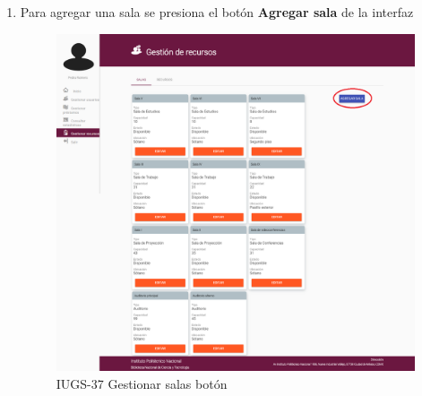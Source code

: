 	\begin{enumerate}
		\item Para agregar una sala se presiona 
			el botón \textbf{Agregar sala} de la interfaz \par
			\begin{figure}[hbtp]	
				\centering
					\includegraphics[scale=0.3]{images/Interfaz/IUGS37_GestionarSalasA.png}
			\caption{IUGS-37 Gestionar salas botón}
			\end{figure}			
				
	\end{enumerate}

	